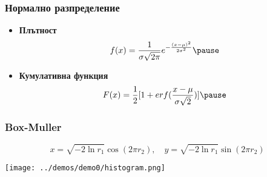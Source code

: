 \begin{frame}
  \frametitle{Нормално разпределение}
  \begin{itemize}
  \item \textbf{Плътност}
  \begin{equation*}
      f(x) = \frac{1}{\sigma \sqrt{2 \pi}} e^{-\frac{(x-\mu)^2}{2\sigma^2}} \pause
  \end{equation*}
  \item \textbf{Кумулативна функция}
  \begin{equation*}
      F(x) = \frac{1}{2} [1 + erf(\frac{x-\mu}{\sigma\sqrt{2}})] \pause
  \end{equation*}
  \end{itemize}
\end{frame}

\begin{frame}
  \frametitle{Box-Muller}
  \begin{equation*}
  x = \sqrt{ -2 \ln r_1} \cos(2\pi r_2), \quad   y = \sqrt{ -2 \ln r_1} \sin(2\pi r_2)
  \end{equation*}
  \begin{centering}
  \texttt{[image: ../demos/demo0/histogram.png]}
  \end{centering}
\end{frame}
